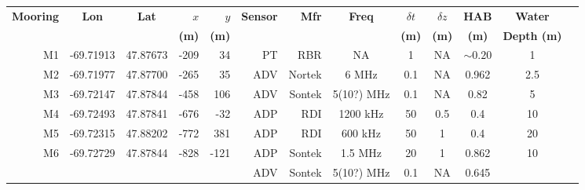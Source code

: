 \documentclass[letterpaper,10pt,landscape]{article}
\begin{document}
\thispagestyle{empty}



\begin{table}
  \centering
  \begin{tabular}{|r|c|c|r|r|r|r|c|c|c|c|c|c|} \hline
    {\bf Mooring}       & {\bf Lon}                  & {\bf Lat}                 & $x$                    & $y$                   & {\bf Sensor} &{\bf Mfr}   & {\bf Freq}&$\delta t$ &$\delta z$& {\bf HAB}  & {\bf Water}         \\
    ~                   &                            &                           & {\bf (m)}              & {\bf (m)}             &              &            &           & {\bf (m)} & {\bf (m)}& {\bf (m)}  & {\bf Depth (m)}     \\\hline \hline
    M1                  & -69.71913                  & 47.87673                  & -209                   & 34                    & PT           & RBR        & NA        & 1         & NA       & $\sim0.20$ & 1                   \\\hline
    M2                  & -69.71977                  & 47.87700                  & -265                   & 35                    & ADV          & Nortek     & 6 MHz     & 0.1       & NA       & 0.962      & 2.5                 \\\hline %
    M3                  & -69.72147                  & 47.87844                  & -458                   & 106                   & ADV          & Sontek     & 5(10?) MHz& 0.1       & NA       & 0.82       & 5                   \\\hline
    M4                  & -69.72493                  & 47.87841                  & -676                   & -32                   & ADP          & RDI        & 1200 kHz  & 50        & 0.5      & 0.4        & 10                  \\\hline
    M5                  & -69.72315                  & 47.88202                  & -772                   & 381                   & ADP          & RDI        & 600 kHz   & 50        & 1        & 0.4        & 20                  \\\hline
    \multirow{4}{*}{M6} & \multirow{4}{*}{-69.72729} & \multirow{4}{*}{47.87844} & \multirow{4}{*}{-828}  & \multirow{4}{*}{-121} & ADP          & Sontek     & 1.5 MHz   & 20        & 1        & 0.862      & \multirow{4}{*}{10} \\ 
    ~                   &                            &                           &                        &                       & ADV          & Sontek     & 5(10?) MHz& 0.1       & NA       & 0.645      &                     \\ 

\end{tabular}
\end{table}
\end{document}
